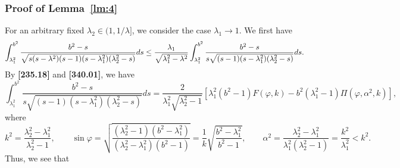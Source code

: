 \documentclass[11pt]{amsart}
\numberwithin{equation}{section}
\numberwithin{figure}{section}
\theoremstyle{plain} %
\theoremstyle{definition} %
\begin{document}
\subsubsection{Proof of Lemma~\ref{lm:4}} %

For an arbitrary fixed $\lambda_2\in (1,1/\lambda]$, we consider the case $\lambda_1\to 1$. 
We first have 
\[
\int_{\lambda_1^2}^{b^2} \frac{b^2-s}{\sqrt{s(s-\lambda^2)(s-1)(s-\lambda_1^2)(\lambda_2^2-s)}}ds\\
 \leq 
\frac{\lambda_1}{\sqrt{\lambda_1^2-\lambda^2}}
\int_{\lambda_1^2}^{b^2} \frac{b^2- s}{s\sqrt{(s-1)(s-\lambda_1^2)(\lambda_2^2-s)}} ds. 
\]
By \textbf{[235.18]} and \textbf{[340.01]}, we have
\[
\int_{\lambda_1^2}^{b^2} \frac{b^2- s}{s\sqrt{(s-1)(s-\lambda_1^2)(\lambda_2^2-s)}} ds 
 = \frac{2}{\lambda_1^2 \sqrt{\lambda_2^2-1}} \left[ \lambda_1^2 (b^2-1) F (\varphi,k) 
- b^2 (\lambda_1^2-1) \Pi (\varphi,\alpha^2,k) \right], 
\]
where 
\[
k^2 = \frac{\lambda_2^2-\lambda_1^2}{\lambda_2^2-1}, \qquad
\sin \varphi = \sqrt{\frac{(\lambda_2^2-1)(b^2-\lambda_1^2)}{(\lambda_2^2-\lambda_1^2)(b^2-1)}}=\frac{1}{k} \sqrt{\frac{b^2-\lambda_1^2}{b^2-1}}, \qquad
\alpha^2 = \frac{ \lambda_2^2-\lambda_1^2 }{\lambda_1^2 (\lambda_2^2 -1)}
=\frac{k^2}{\lambda_1^2}<k^2. 
\]
Thus, we see that  
\end{document}
